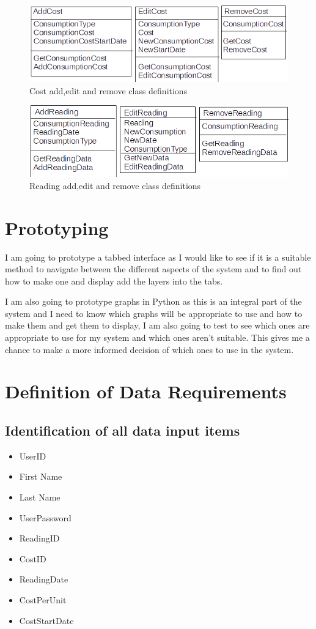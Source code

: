 \begin{figure}[H]
\includegraphics{./design/costclassdefinitions.png}
\caption{Cost add,edit and remove class definitions}
\end{figure}

\begin{figure}[H]
\includegraphics{./design/readingclassdefinitions.png}
\caption{Reading add,edit and remove class definitions}
\end{figure}

\section{Prototyping}
I am going to prototype a tabbed interface as I would like to see if it is a suitable method to navigate between the different aspects of the system and to find out how to make one and display add the layers into the tabs.

I am also going to prototype graphs in Python as this is an integral part of the system and I need to know which graphs will be appropriate to use and how to make them and get them to display, I am also going to test to see which ones are appropriate to use for my system and which ones aren't suitable. This gives me a chance to make a more informed decision of which ones to use in the system.

\section{Definition of Data Requirements}

\subsection{Identification of all data input items}
\begin{itemize}
\item{UserID}
\item{First Name}
\item{Last Name}
\item{UserPassword}
\item{ReadingID}
\item{CostID}
\item{ReadingDate}
\item{CostPerUnit}
\item{CostStartDate}
\end{itemize}

